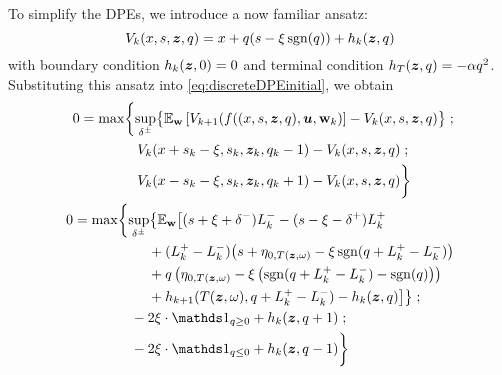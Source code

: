 To simplify the DPEs, we introduce a now familiar ansatz:
\begin{equation}
\label{eq:ansatzHdscr}
V_k (x,s,\bm{z},q) = x + q(s-\xi\operatorname{\mathrm{sgn}}(q)) + h_k(\bm{z},q)
\end{equation}
with boundary condition $h_k(\bm{z},0) = 0$ and terminal condition $h_T(\bm{z},q) = -\alpha q^2$. Substituting this ansatz into \eqref{eq:discreteDPEinitial}, we obtain
\begin{align}
\begin{split}
0 & = \max \biggl\lbrace \sup_{\delta^\pm} \bigl\lbrace \E_{\bw} \left[ V_{k+1} (f((x,s,\bz,q),\bu,\bw_k) \right] - V_k (x,s,\bz,q) \bigr\rbrace \; ; \\
& \hphantom{{}={} \max \biggl\lbrace} V_k(x+s_k-\xi,s_k, \bz_k, q_k -1) - V_k (x,s,\bz,q)\; ; \\
& \hphantom{{}={} \max \biggl\lbrace} V_k(x-s_k-\xi,s_k, \bz_k, q_k +1) - V_k (x,s,\bz,q) \biggr\rbrace
\end{split} \\
\label{eq:discreteDPE}
\begin{split}
0 & = \max \biggl\lbrace 
\sup_{\delta^\pm} \bigl\lbrace \E_{\bw} \bigl[
(s + \xi + \delta^-)L_k^- - (s - \xi - \delta^+)L_k^+ \\
& \hphantom{\sup_{\bu} \biggl\lbrace \E_{\bw} \biggl[ {}+{}} + (L_k^+ - L_k^-) \bigl( s + \eta_{0,T(\bz, \omega)}  -\xi\sgn( q + L_k^+ - L_k^-)   \bigr) \\
& \hphantom{\sup_{\bu} \biggl\lbrace \E_{\bw} \biggl[ {}+{}} + q\left( \eta_{0,T(\bz, \omega)}  -\xi \left( \sgn( q + L_k^+ - L_k^-) - \sgn(q) \right) \right) \\
& \hphantom{\sup_{\bu} \biggl\lbrace \E_{\bw} \biggl[ {}+{}} + h_{k+1}(T(\bz,\omega), q + L_k^+ - L_k^- ) -  h_k(\bz,q) \bigr] \bigr\rbrace \; ;\\
& \hphantom{{}={} \max \biggl\lbrace } -2\xi \cdot \indicator_{q \geq 0} + h_k(\bz,q+1) \; ; \\
& \hphantom{{}={} \max \biggl\lbrace } -2\xi \cdot \indicator_{q \leq 0} + h_k(\bz,q-1) \biggr\rbrace
\end{split}
\end{align}

